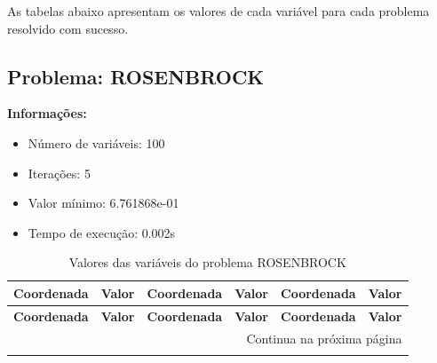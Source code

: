 \documentclass[12pt]{article}
\begin{document}
As tabelas abaixo apresentam os valores de cada variável para cada problema resolvido com sucesso.


\newpage            
\subsection{Problema: ROSENBROCK}

\textbf{Informações:}
\begin{itemize}
\item Número de variáveis: 100
\item Iterações: 5
\item Valor mínimo: 6.761868e-01
\item Tempo de execução: 0.002s
\end{itemize}

\small
\begin{longtable}{@{}cc|cc|cc@{}}
\caption{Valores das variáveis do problema ROSENBROCK} \\
\toprule
\textbf{Coordenada} & \textbf{Valor} & \textbf{Coordenada} & \textbf{Valor} & \textbf{Coordenada} & \textbf{Valor} \\
\midrule
\endfirsthead

\toprule
\textbf{Coordenada} & \textbf{Valor} & \textbf{Coordenada} & \textbf{Valor} & \textbf{Coordenada} & \textbf{Valor} \\
\midrule
\endhead

\midrule \multicolumn{6}{r}{{Continua na próxima página}} \\ \midrule
\endfoot


\end{longtable}
\end{document}
